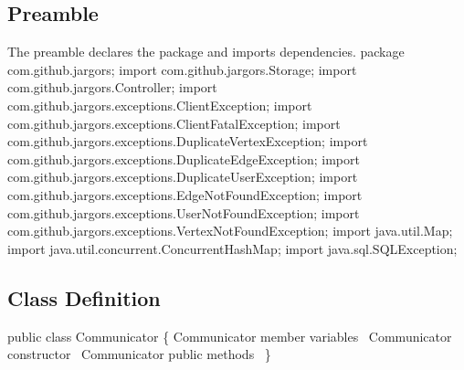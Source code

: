 \subsection{Preamble}
\label{sec:preamble}
The preamble declares the package and imports dependencies.
\nwenddocs{}\endmoddef{}
package com.github.jargors;
\nwendcode{}\nwdocspar
\nwenddocs{}\plusendmoddef
import com.github.jargors.Storage;
import com.github.jargors.Controller;
import com.github.jargors.exceptions.ClientException;
import com.github.jargors.exceptions.ClientFatalException;
import com.github.jargors.exceptions.DuplicateVertexException;
import com.github.jargors.exceptions.DuplicateEdgeException;
import com.github.jargors.exceptions.DuplicateUserException;
import com.github.jargors.exceptions.EdgeNotFoundException;
import com.github.jargors.exceptions.UserNotFoundException;
import com.github.jargors.exceptions.VertexNotFoundException;
import java.util.Map;
import java.util.concurrent.ConcurrentHashMap;
import java.sql.SQLException;
\nwendcode{}\nwdocspar

\subsection{Class Definition}
\label{sec:class-definition}
\nwenddocs{}\endmoddef{}
public class Communicator \{
  \LA{}\code{}Communicator\edoc{} member variables~{\nwtagstyle{}}\RA{}
  \LA{}\code{}Communicator\edoc{} constructor~{\nwtagstyle{}}\RA{}
  \LA{}\code{}Communicator\edoc{} public methods~{\nwtagstyle{}}\RA{}
\}
\nwendcode{}\nwdocspar

